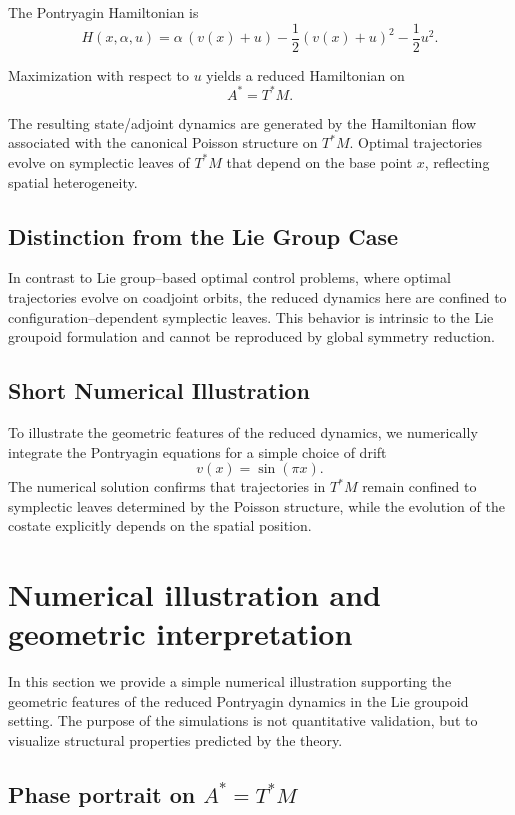 \documentclass{article}
\begin{document}
The Pontryagin Hamiltonian is
\[
H(x, \alpha, u) = \alpha \, (v(x) + u) - \frac{1}{2} (v(x) + u)^2 - \frac{1}{2} u^2.
\]

Maximization with respect to $u$ yields a reduced Hamiltonian on 
\[
A^* = T^*M.
\]

The resulting state/adjoint dynamics are generated by the Hamiltonian flow associated with the canonical Poisson structure on $T^*M$. Optimal trajectories evolve on symplectic leaves of $T^*M$ that depend on the base point $x$, reflecting spatial heterogeneity.

\subsection*{Distinction from the Lie Group Case}

In contrast to Lie group–based optimal control problems, where optimal trajectories evolve on coadjoint orbits, the reduced dynamics here are confined to configuration–dependent symplectic leaves. This behavior is intrinsic to the Lie groupoid formulation and cannot be reproduced by global symmetry reduction.

\subsection*{Short Numerical Illustration}

To illustrate the geometric features of the reduced dynamics, we numerically integrate the Pontryagin equations for a simple choice of drift 
\[
v(x) = \sin(\pi x).
\] 
The numerical solution confirms that trajectories in $T^*M$ remain confined to symplectic leaves determined by the Poisson structure, while the evolution of the costate explicitly depends on the spatial position.

\section{Numerical illustration and geometric interpretation}

In this section we provide a simple numerical illustration supporting the geometric features of the reduced Pontryagin dynamics in the Lie groupoid setting. The purpose of the simulations is not quantitative validation, but to visualize structural properties predicted by the theory.

\subsection{Phase portrait on $A^* = T^*M$}
\end{document}
